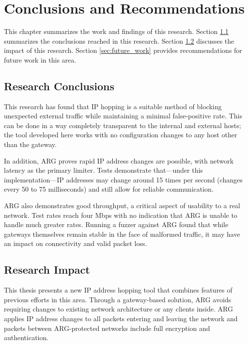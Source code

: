\chapter{Conclusions and Recommendations}
\label{chp:conclusion}
\par This chapter summarizes the work and findings of this research. Section \ref{sec:research_conclusions} summarizes the conclusions reached in this research. Section \ref{sec:research_impact} discusses the impact of this research. Section \ref{sec:future_work} provides recommendations for future work in this area.

\section{Research Conclusions}
\label{sec:research_conclusions}
\par This research has found that \ac{IP} hopping is a suitable method of blocking unexpected external traffic while maintaining a minimal false-positive rate. This can be done in a way completely transparent to the internal and external hosts; the tool developed here works with no configuration changes to any host other than the gateway.

\par In addition, \ac{ARG} proves rapid \ac{IP} address changes are possible, with network latency as the primary limiter. Tests demonstrate that---under this implementation---\ac{IP} addresses may change around 15 times per second (changes every 50 to 75 milliseconds) and still allow for reliable communication. 

\ac{ARG} also demonstrates good throughput, a critical aspect of usability to a real network. Test rates reach four \ac{Mbps} with no indication that \ac{ARG} is unable to handle much greater rates. Running a fuzzer against \ac{ARG} found that while gateways themselves remain stable in the face of malformed traffic, it may have an impact on connectivity and valid packet loss.

\section{Research Impact}
\label{sec:research_impact}
\par This thesis presents a new \ac{IP} address hopping tool that combines features of previous efforts in this area. Through a gateway-based solution, \ac{ARG} avoids requiring changes to existing network architecture or any clients inside. \ac{ARG} applies \ac{IP} address changes to all packets entering and leaving the network and packets between \ac{ARG}-protected networks include full encryption and authentication.

